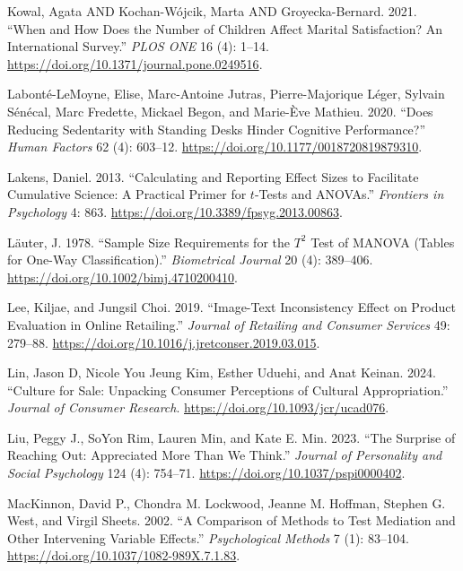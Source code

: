 \documentclass[
  11pt,
  letterpaper,
]{scrbook}
\newlength{\cslhangindent}
\newenvironment{CSLReferences}[2] %
 {\begin{list}{}{%
  \setlength{\itemindent}{0pt}
  \setlength{\leftmargin}{0pt}
  \setlength{\parsep}{0pt}
  \ifodd #1
   \setlength{\leftmargin}{\cslhangindent}
   \setlength{\itemindent}{-1\cslhangindent}
  \fi
  \setlength{\itemsep}{#2\baselineskip}}}
 {\end{list}}
\theoremstyle{definition}
\theoremstyle{definition}
\theoremstyle{remark}
\begin{document}
\begin{CSLReferences}{1}{0}
Kowal, Agata AND Kochan-Wójcik, Marta AND Groyecka-Bernard. 2021.
{``When and How Does the Number of Children Affect Marital Satisfaction?
An International Survey.''} \emph{PLOS ONE} 16 (4): 1--14.
\url{https://doi.org/10.1371/journal.pone.0249516}.

Labonté-LeMoyne, Elise, Marc-Antoine Jutras, Pierre-Majorique Léger,
Sylvain Sénécal, Marc Fredette, Mickael Begon, and Marie-Ève Mathieu.
2020. {``Does Reducing Sedentarity with Standing Desks Hinder Cognitive
Performance?''} \emph{Human Factors} 62 (4): 603--12.
\url{https://doi.org/10.1177/0018720819879310}.

Lakens, Daniel. 2013. {``Calculating and Reporting Effect Sizes to
Facilitate Cumulative Science: A Practical Primer for \(t\)-Tests and
ANOVAs.''} \emph{Frontiers in Psychology} 4: 863.
\url{https://doi.org/10.3389/fpsyg.2013.00863}.

Läuter, J. 1978. {``Sample Size Requirements for the \(T^2\) Test of
{MANOVA} (Tables for One-Way Classification).''} \emph{Biometrical
Journal} 20 (4): 389--406.
\url{https://doi.org/10.1002/bimj.4710200410}.

Lee, Kiljae, and Jungsil Choi. 2019. {``Image-Text Inconsistency Effect
on Product Evaluation in Online Retailing.''} \emph{Journal of Retailing
and Consumer Services} 49: 279--88.
\url{https://doi.org/10.1016/j.jretconser.2019.03.015}.

Lin, Jason D, Nicole You Jeung Kim, Esther Uduehi, and Anat Keinan.
2024. {``Culture for Sale: Unpacking Consumer Perceptions of Cultural
Appropriation.''} \emph{Journal of Consumer Research}.
\url{https://doi.org/10.1093/jcr/ucad076}.

Liu, Peggy J., SoYon Rim, Lauren Min, and Kate E. Min. 2023. {``The
Surprise of Reaching Out: Appreciated More Than We Think.''}
\emph{Journal of Personality and Social Psychology} 124 (4): 754--71.
\url{https://doi.org/10.1037/pspi0000402}.

MacKinnon, David P., Chondra M. Lockwood, Jeanne M. Hoffman, Stephen G.
West, and Virgil Sheets. 2002. {``A Comparison of Methods to Test
Mediation and Other Intervening Variable Effects.''} \emph{Psychological
Methods} 7 (1): 83--104. \url{https://doi.org/10.1037/1082-989X.7.1.83}.


\end{CSLReferences}
\end{document}
